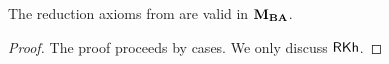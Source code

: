 \medskip 

\begin{lemma}\label{lemma:arrow-kh-valid}
	The reduction axioms from  are valid in $\mathbf{M}_{\mathbf{BA}}$.
\end{lemma}

\begin{proof} The proof proceeds by cases. We only discuss $\textsf{RKh}$.
	
	
	
	

\end{proof}
